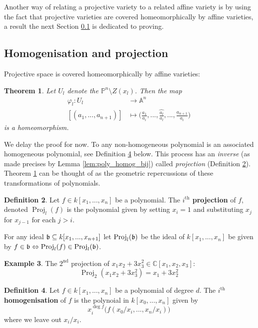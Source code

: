 \documentclass[12pt]{article}
\theoremstyle{plain}
\newtheorem{thm}{Theorem}[subsection] %
\theoremstyle{definition}
\newtheorem{defn}[thm]{Definition} %
\newtheorem{example}[thm]{Example}
\newcommand{\bb}[1]{\mathbb{#1}}
\begin{document}
Another way of relating a projective variety to a related affine variety is by using the fact that projective varieties are covered homeomorphically by affine varieties, a result the next Section \ref{sec:homog_proj} is dedicated to proving.
\subsection{Homogenisation and projection}\label{sec:homog_proj}
Projective space is covered homeomorphically by affine varieties:
\begin{thm}\label{thm:proj_covered_aff}
\label{projaff}
Let $U_l$ denote the $\bb{P}^n\setminus Z(x_l)$. Then the map
\begin{align*}
    \varphi_l: U_l &\to \bb{A}^n\\
    [(a_1,...,a_{n+1})] &\mapsto \Big(\frac{a_1}{a_i},...,\hat{\frac{a_l}{a_l}},...,\frac{a_{n+1}}{a_i}\Big)
\end{align*}
is a homeomorphism.
\end{thm}
We delay the proof for now. To any non-homogeneous polynomial is an associated homogeneous polynomial, see Definition \ref{def:homogenisation} below. This process has an \emph{inverse} (as made precises by Lemma \ref{lem:poly_homog_bij}) called \emph{projection} (Definition \ref{def:projection}). Theorem \ref{thm:proj_covered_aff} can be thought of as the geometric repercussions of these transformations of polynomials.
%
\begin{defn}\label{def:projection}
Let $f \in k[x_1,...,x_n]$ be a polynomial. The \textbf{$i^{\text{th}}$ projection} of $f$, denoted $\operatorname{Proj}_l(f)$ is the polynomial given by setting $x_{i} = 1$ and substituting $x_j$ for $x_{j-1}$ for each $j > i$.

For any ideal $\frak{b} \subseteq k[x_1,...,x_{n+1}]$ let $\operatorname{Proj}_l(\frak{b})$ be the ideal of $k[x_1,...,x_n]$ be given by $f \in \frak{b} \Leftrightarrow \operatorname{Proj}_l(f) \in \operatorname{Proj}_l(\frak{b})$.
\end{defn}
\begin{example}
The $2^{\text{nd}}$ projection of $x_1x_2 + 3x_3^2 \in \bb{C}[x_1,x_2,x_3]$:
\begin{equation}
    \operatorname{Proj}_2(x_1x_2 + 3x_3^2) = x_1 + 3x_2^2
\end{equation}
\end{example}
\begin{defn}\label{def:homogenisation}
Let $f \in k[x_1,...,x_n]$ be a polynomial of degree $d$. The \textbf{$i^{\text{th}}$ homogenisation} of $f$ is the polynoial in $k[x_0,...,x_n]$ given by
\begin{equation}
    x_i^{\operatorname{deg}f}\big(f(x_0/x_i,...,x_n/x_i)\big)
\end{equation}
where we leave out $x_i/x_i$.
\end{defn}
\end{document}
